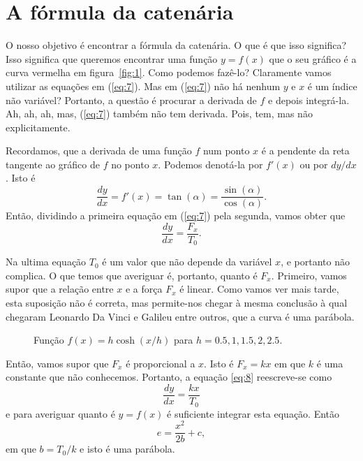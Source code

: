 \section{A fórmula da catenária}

O nosso objetivo é encontrar a fórmula da catenária. O que é que isso significa? Isso significa que queremos encontrar uma função $y=f(x)$ que o
seu gráfico é a curva vermelha em figura~\ref{fig:1}. Como podemos
fazê-lo? Claramente vamos utilizar as equações em
(\ref{eq:7}). Mas em (\ref{eq:7}) não há nenhum $y$ e $x$ é um
índice não variável? Portanto, a questão é procurar a derivada de $f$ e
depois integrá-la. Ah, ah, ah, mas, (\ref{eq:7}) também não tem derivada.
Pois, tem, mas não explicitamente.



 Recordamos, que a derivada de
uma função $f$ num ponto $x$ é a pendente da reta tangente
ao gráfico de $f$ no ponto $x$. Podemos denotá-la por $f'(x)$ ou por
$dy/dx$. Isto é
\begin{displaymath}
  \frac{dy}{dx}=f'(x)=\tan(\alpha)=\frac{\sin(\alpha)}{\cos(\alpha)}.
\end{displaymath}
Então, dividindo a primeira equação em (\ref{eq:7}) pela segunda, vamos obter que
\begin{equation}
  \label{eq:8}
  \frac{dy}{dx}=\frac{F_x}{T_0}.
\end{equation}

Na ultima equação $T_0$ é um valor que não depende da variável
$x$, e portanto não complica. O que temos que averiguar é,
portanto, quanto é $F_x$. Primeiro, vamos supor que a relação
entre $x$ e a força $F_x$ é linear. Como vamos ver mais tarde, esta
suposição não é correta, mas permite-nos chegar à mesma
conclusão à qual chegaram Leonardo Da Vinci e Galileu entre outros, que a
curva é uma parábola.


\begin{figure}
  \begin{figurebox}
      \centering
  \scalebox{0.57}{}
  \caption{Função $f(x)=h \cosh(x/h)$ para
    $h = 0.5, 1, 1.5, 2, 2.5$.}
  \label{fig:15}
  \end{figurebox}
  \vspace{5pt}
\end{figure}

Então, vamos supor que $F_x$ é proporcional a $x$. Isto é $F_x= k x
$ em que $k$ é uma constante que não conhecemos. Portanto, a
equação \eqref{eq:8} reescreve-se como
\begin{displaymath}
  \frac{dy}{dx}=\frac{k x}{T_0}
\end{displaymath}
e para averiguar quanto é $y=f(x)$ é suficiente integrar esta
equação. Então
\begin{displaymath}
  e= \frac{x^2}{2b}+c,
\end{displaymath}
em que $b=T_0/k$ e isto é uma parábola.


